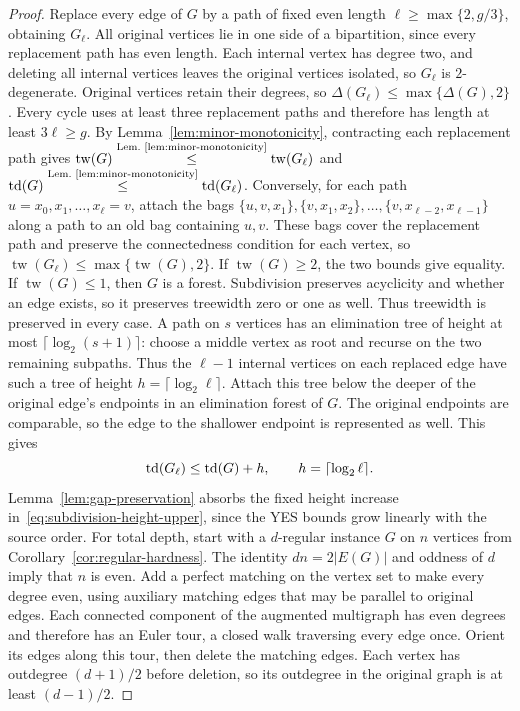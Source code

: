 \begin{proof}
Replace every edge of $G$ by a path of fixed even length
$\ell\geq\max\{2,g/3\}$, obtaining $G_\ell$. All original vertices
lie in one side of a bipartition, since every replacement path has
even length. Each internal vertex has degree two, and deleting all
internal vertices leaves the original vertices isolated, so
$G_\ell$ is $2$-degenerate. Original vertices retain their degrees,
so $\Delta(G_\ell)\leq\max\{\Delta(G),2\}$.
Every cycle uses at least three
replacement paths and therefore has length at least $3\ell\geq g$.
By Lemma~\ref{lem:minor-monotonicity}, contracting each replacement
path gives
$\operatorname{tw}(G)
\overset{\text{Lem.~\ref{lem:minor-monotonicity}}}{\leq}
\operatorname{tw}(G_\ell)$ and
$\operatorname{td}(G)\overset{\text{Lem.~\ref{lem:minor-monotonicity}}}{\leq}
\operatorname{td}(G_\ell)$. Conversely, for each path
$u=x_0,x_1,\ldots,x_\ell=v$, attach the bags
$\{u,v,x_1\},\{v,x_1,x_2\},\ldots,
\{v,x_{\ell-2},x_{\ell-1}\}$ along a path to an old bag containing
$u,v$. These bags cover the replacement path and preserve the
connectedness condition for each vertex, so
$\operatorname{tw}(G_\ell)\leq\max\{\operatorname{tw}(G),2\}$.
If $\operatorname{tw}(G)\ge2$, the two bounds give equality.
If $\operatorname{tw}(G)\le1$, then $G$ is a forest. Subdivision
preserves acyclicity and whether an edge exists, so it preserves
treewidth zero or one as well. Thus treewidth is preserved in every case.
A path on $s$ vertices has an
elimination tree of height at most $\lceil\log_2(s+1)\rceil$: choose
a middle vertex as root and recurse on the two remaining subpaths.
Thus the $\ell-1$ internal vertices on each replaced edge have such
a tree of height $h=\lceil\log_2\ell\rceil$. Attach this tree below
the deeper of the original edge's endpoints in an elimination forest
of $G$. The original endpoints are comparable, so the edge to the
shallower endpoint is represented as well. This gives
\begin{equation}\label{eq:subdivision-height-upper}
 \operatorname{td}(G_\ell)\leq\operatorname{td}(G)+h,\qquad h=\lceil\log_2\ell\rceil.
\end{equation}
Lemma~\ref{lem:gap-preservation} absorbs the fixed height increase
in~\eqref{eq:subdivision-height-upper}, since the YES bounds grow
linearly with the source order. For
total depth, start with a
$d$-regular instance $G$ on $n$ vertices from
Corollary~\ref{cor:regular-hardness}.
The identity $dn=2|E(G)|$ and oddness of $d$ imply that $n$ is even.
Add a perfect matching on the vertex set to make every degree even,
using auxiliary matching edges that may be parallel to original edges.
Each connected component of the augmented multigraph has even
degrees and therefore has an Euler tour, a closed walk traversing
every edge once. Orient its edges along this tour, then delete the
matching edges. Each vertex has outdegree
$(d+1)/2$ before deletion, so its outdegree in the original graph is
at least $(d-1)/2$.


\end{proof}
